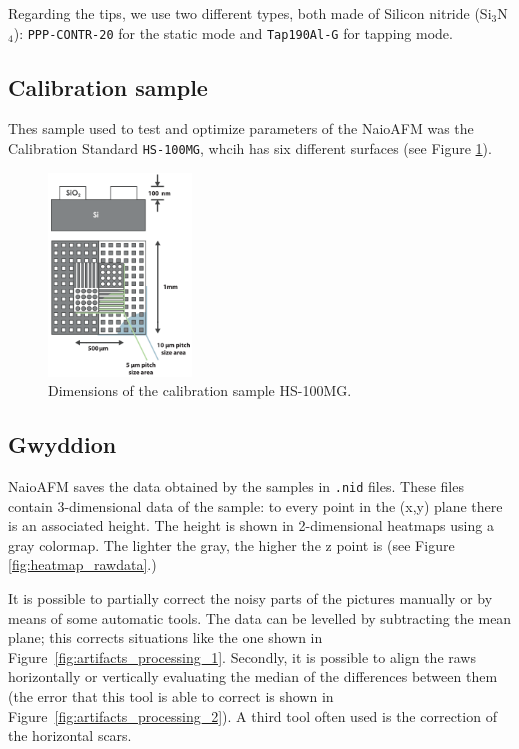 \documentclass[11pt,a4paper]{article}
\begin{document}
Regarding the tips, we use two different types, both made of Silicon nitride (Si$_3$N$_4$): \texttt{PPP-CONTR-20} for the static mode and \texttt{Tap190Al-G} for tapping mode.

\subsection{Calibration sample}

Thes sample used to test and optimize parameters of the NaioAFM was the Calibration Standard \texttt{HS-100MG}, whcih has six different surfaces (see Figure \ref{fig:HS-100MG}).

\begin{figure}[H]
\centering
\includegraphics[width=0.34\textwidth]{HS-100MG}
\caption{Dimensions of the calibration sample HS-100MG.}
\label{fig:HS-100MG}
\end{figure}

\subsection{Gwyddion}

NaioAFM saves the data obtained by the samples in \texttt{.nid} files. These files contain 3-dimensional data of the sample: to every point in the (x,y) plane there is an associated height. The height is shown in 2-dimensional heatmaps using a gray colormap. The lighter the gray, the higher the z point is (see Figure \ref{fig:heatmap_rawdata}.)

It is possible to partially correct the noisy parts of the pictures manually or by means of some automatic tools. The data can be levelled by subtracting the mean plane; this corrects situations like the one shown in Figure~\ref{fig:artifacts_processing_1}. Secondly, it is possible to align the raws horizontally or vertically evaluating the median of the differences between them (the error that this tool is able to correct is shown in Figure~\ref{fig:artifacts_processing_2}). A third tool often used is the correction of the horizontal scars.
\end{document}
